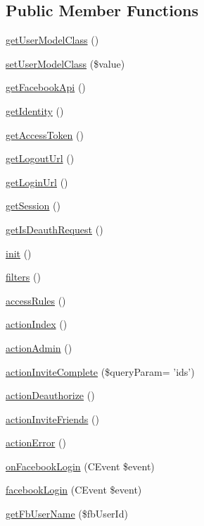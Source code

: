 \subsection*{Public Member Functions}
\begin{DoxyCompactItemize}
\item 
\hyperlink{classCPSFacebookAppController_a0b280ce1a525781c8943e5101471a6c0}{getUserModelClass} ()
\item 
\hyperlink{classCPSFacebookAppController_ae0af15a6b8117c8e984beae8e585fcd2}{setUserModelClass} (\$value)
\item 
\hyperlink{classCPSFacebookAppController_a0588504e111b21b1e1380b70ebe30b2f}{getFacebookApi} ()
\item 
\hyperlink{classCPSFacebookAppController_a8d0c4e1299abe333956fca30fdc44143}{getIdentity} ()
\item 
\hyperlink{classCPSFacebookAppController_a5d251c70a3f9f9daaff7f00ec5f894c0}{getAccessToken} ()
\item 
\hyperlink{classCPSFacebookAppController_a4455e1688e73f1dba89f3f74d1334937}{getLogoutUrl} ()
\item 
\hyperlink{classCPSFacebookAppController_a37af09a26efc969d1381851b8c379808}{getLoginUrl} ()
\item 
\hyperlink{classCPSFacebookAppController_aefa4c5bd150e2a7d525576d7959c6911}{getSession} ()
\item 
\hyperlink{classCPSFacebookAppController_aab9fd8efbb71dfc96d46f37bf13f95dc}{getIsDeauthRequest} ()
\item 
\hyperlink{classCPSFacebookAppController_a4be4055f3361d4800e16bc2e2e38cda6}{init} ()
\item 
\hyperlink{classCPSFacebookAppController_afe5dbb3e026bc3bfdecbd539025c7f93}{filters} ()
\item 
\hyperlink{classCPSFacebookAppController_a06b9943f26298eca9387c6099343b938}{accessRules} ()
\item 
\hyperlink{classCPSFacebookAppController_ae955b1cdd5f2adcae90f9e744d8cc7a6}{actionIndex} ()
\item 
\hyperlink{classCPSFacebookAppController_a251c5654a2fa56e2db1fed76f1213e18}{actionAdmin} ()
\item 
\hyperlink{classCPSFacebookAppController_a0781439fc2f14283719e441f1ca2b73e}{actionInviteComplete} (\$queryParam= 'ids')
\item 
\hyperlink{classCPSFacebookAppController_ae81ecfd4dd63d17b0e8eec3c2179bf0f}{actionDeauthorize} ()
\item 
\hyperlink{classCPSFacebookAppController_ab2ff8b9313c96e3605f730f21f29b384}{actionInviteFriends} ()
\item 
\hyperlink{classCPSFacebookAppController_a8471fa2c95307d608c34f15dae47d254}{actionError} ()
\item 
\hyperlink{classCPSFacebookAppController_a023e71297825d72b643617f9fdf25355}{onFacebookLogin} (CEvent \$event)
\item 
\hyperlink{classCPSFacebookAppController_ab64866966afd63a8e70d4d3693dd728b}{facebookLogin} (CEvent \$event)
\item 
\hyperlink{classCPSFacebookAppController_a790701ff73be7c0b993611e88baed25d}{getFbUserName} (\$fbUserId)
\end{DoxyCompactItemize}
